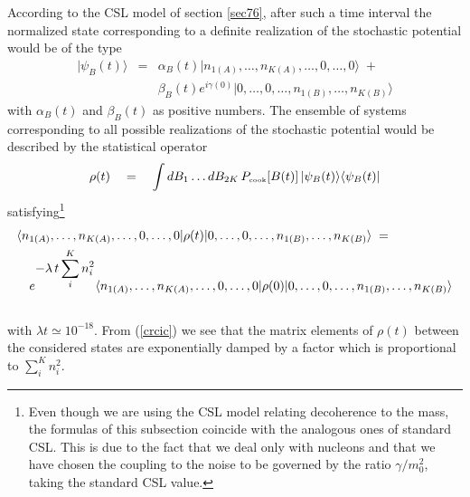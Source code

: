 \documentclass[12pt]{article}
\begin{document}
According to the CSL model of section \ref{sec76}, after such a
time interval the normalized state corresponding to a definite
realization of the stochastic potential would be of the type
\begin{eqnarray} \label{fhs}
|\psi_{B}(t)\rangle & = & \alpha_{B}(t)|n_{1(A)}, \ldots,
n_{K(A)}, \ldots, 0, \ldots, 0\rangle \; + \nonumber \\
& & \beta_{B}(t) e^{i\gamma(0)} |0, \ldots, 0, \ldots, n_{1(B)},
\ldots, n_{K(B)} \rangle
\end{eqnarray}
with $\alpha_{B}(t)$ and $\beta_{B}(t)$ as positive numbers. The
ensemble of systems corresponding to all possible realizations of
the stochastic potential would be described by the statistical
operator
\begin{equation} \label{fhs2}
\rho(t) \quad = \quad \int dB_{1} \ldots dB_{2K}\,
P_{\makebox{\tiny cook}}[B(t)]\, |\psi_{B}(t)\rangle
\langle\psi_{B}(t)|
\end{equation}
satisfying\footnote{Even though we are using the CSL model
relating decoherence to the mass, the formulas of this subsection
coincide with the analogous ones of standard CSL. This is due to
the fact that we deal only with nucleons and that we have chosen
the coupling to the noise to be governed by the ratio
$\gamma/m_{0}^{2}$, taking the standard CSL value.}
\begin{eqnarray} \label{crcic}
\lefteqn{ \langle n_{1(A)}, \ldots, n_{K(A)}, \ldots, 0, \ldots,
0| \rho(t) |0, \ldots, 0, \ldots, n_{1(B)}, \ldots,
n_{K(B)}\rangle \; =}
\nonumber \\
& & e^{\displaystyle -\lambda\, t \sum_{i}^{K} n_{i}^{2}} \langle
n_{1(A)}, \ldots, n_{K(A)}, \ldots, 0, \ldots, 0| \rho(0) |0,
\ldots, 0, \ldots, n_{1(B)}, \ldots, n_{K(B)}\rangle \nonumber \\
& &
\end{eqnarray}
with $\lambda t \simeq 10^{-18}$. From (\ref{crcic}) we see that
the matrix elements of $\rho(t)$ between the considered states are
exponentially damped by a factor which is proportional to
$\sum_{i}^{K}n^{2}_{i}$.
\end{document}
